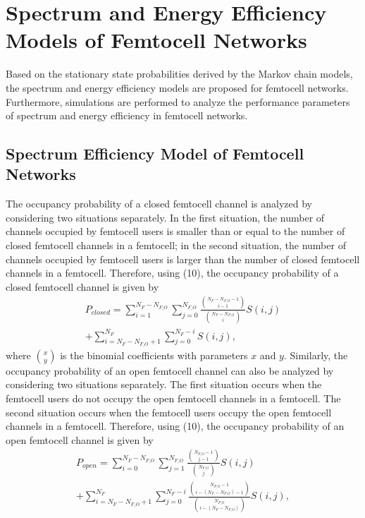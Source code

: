 \documentclass[10pt,final,journal,letterpaper,twoside,twocolumn]{IEEEtran}
\begin{document}
\section{Spectrum and Energy Efficiency Models of Femtocell Networks}
\label{sec4}

Based on the stationary state probabilities derived by the Markov chain models, the spectrum and energy efficiency models are proposed for femtocell networks. Furthermore, simulations are performed to analyze the performance parameters of spectrum and energy efficiency in femtocell networks.

\subsection{Spectrum Efficiency Model of Femtocell Networks}

The occupancy probability of a closed femtocell channel is analyzed by considering two situations separately. In the first situation, the number of channels occupied by femtocell users is smaller than or equal to the number of closed femtocell channels in a femtocell; in the second situation, the number of channels occupied by femtocell users is larger than the number of closed femtocell channels in a femtocell. Therefore, using (10), the occupancy probability of a closed femtocell channel is given by
\begin{equation}
\begin{split}
{P_{closed}} = \sum\limits_{i = 1}^{{N_F} - {N_{F\_O}}} {\sum\limits_{j = 0}^{{N_{F\_O}}} {\frac{{\binom{{N_F} - {N_{F\_O}} - 1}{i - 1}}}{{\binom{{N_F} - {N_{F\_O}}}{i}}}} } S\left( {i,j} \right)\\
 + \sum\limits_{i = {N_F} - {N_{F\_O}} + 1}^{{N_F}} {\sum\limits_{j = 0}^{{N_F} - i} {S\left( {i,j} \right)} } ,
\end{split}
\label{eq27}
\tag{20}
\end{equation}
where $\binom{x}{y}$ is the binomial coefficients with parameters $x$ and $y$. Similarly, the occupancy probability of an open femtocell channel can also be analyzed by considering two situations separately. The first situation occurs when the femtocell
users do not occupy the open femtocell channels in a femtocell. The second situation occurs when the femtocell users occupy the open femtocell channels in a femtocell.
Therefore, using (10), the occupancy probability of an open femtocell channel is given by
\begin{equation}
\begin{split}
{P_{open}} = \sum\limits_{i = 0}^{{N_F} - {N_{F\_O}}} {\sum\limits_{j = 1}^{{N_{F\_O}}} {\frac{{\binom{{N_{F\_O}} - 1}{j - 1}}}{{\binom{{N_{F\_O}}}{j}}}} } S\left( {i,j} \right) \\
+ \sum\limits_{i = {N_F} - {N_{F\_O}} + 1}^{{N_F}} {\sum\limits_{j = 0}^{{N_F} - i} {\frac{{\binom{{N_{F\_O}} - 1}{i - ({N_F} - {N_{F\_O}}) - 1}}}{{\binom{{N_{F\_O}}}{i - ({N_F} - {N_{F\_O}})}}}} } S\left( {i,j} \right) ,
\end{split}
\label{eq28}
\tag{21}
\end{equation}
\end{document}
